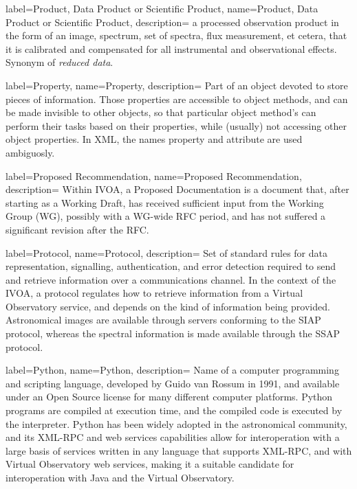 {
    label={Product\gls{, }Data Product\gls{ or }Scientific Product},
    name={Product\gls{, }Data Product\gls{ or }Scientific Product},
    description={
    	a processed observation product in the form of an image,
        spectrum, set of spectra, flux measurement, et cetera, that it
        is calibrated and compensated for all instrumental and
        observational effects. Synonym of \emph{reduced data}.
    }
}

{
    label={Property},
    name={Property},
    description={
    	Part of an object devoted to store pieces of information. Those
        properties are accessible to object methods, and can be made
        invisible to other objects, so that particular object method's
        can perform their tasks based on their properties, while
        (usually) not accessing other object properties. In \gls{XML},
        the names property and attribute are used ambiguosly.
    }
}

{
    label={Proposed Recommendation},
    name={Proposed Recommendation},
    description={
    	Within \gls{IVOA}, a Proposed Documentation is a document that,
        after starting as a Working Draft, has received sufficient
        input from the \gls{Working Group} (WG), possibly with a
        WG-wide \gls{RFC} period, and has not suffered a significant
        revision after the RFC.
    }
}

{
    label={Protocol},
    name={Protocol},
    description={
    	Set of standard rules for data representation, signalling,
        authentication, and error detection required to send and
        retrieve information over a communications channel. In the
        context of the \gls{IVOA}, a protocol regulates how to retrieve
        information from a \gls{Virtual Observatory} service, and depends on
        the kind of information being provided. Astronomical images are
        available through servers conforming to the \gls{SIAP}
        protocol, whereas the spectral information is made available
        through the \gls{SSAP} protocol.
    }
}

{
    label={Python},
    name={Python},
    description={
    	Name of a computer programming and scripting language,
        developed by Guido van Rossum in 1991, and available under an
        \gls{Open Source} license for many different computer
        platforms. Python programs are compiled at execution time, and
        the compiled code is executed by the interpreter. Python has
        been widely adopted in the astronomical community, and its
        \gls{XML-RPC} and \gls{web services} capabilities allow for
        interoperation with a large basis of services written in any
        language that supports \gls{XML-RPC}, and with \gls{Virtual
        Observatory} web services, making it a suitable candidate for
        interoperation with Java and the Virtual Observatory.
    }
}

